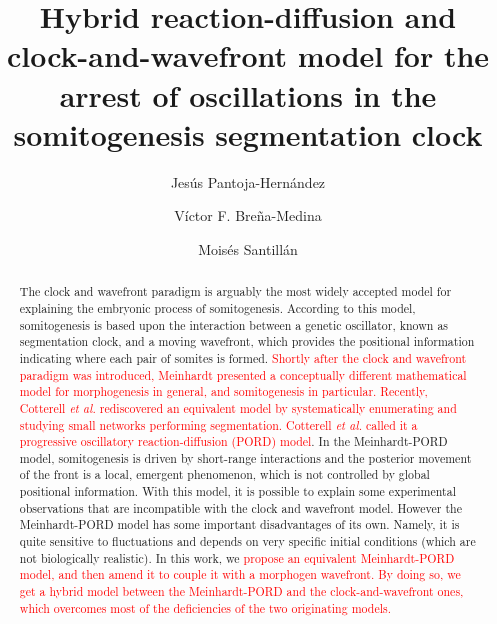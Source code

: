 \documentclass[%
 preprint,
 aip, 
 amsmath,amssymb,
]{revtex4-2}
\begin{document}
\title{Hybrid reaction-diffusion and clock-and-wavefront model for the arrest of oscillations in the somitogenesis segmentation clock}

\author{Jes\'us Pantoja-Hern\'andez}

\author{V\'ictor F. Bre\~na-Medina}

\author{Mois\'es Santill\'an}

\begin{abstract}
The clock and wavefront paradigm is arguably the most widely accepted model for explaining the embryonic process of somitogenesis. According to this model, somitogenesis is based upon the interaction between a genetic oscillator, known as segmentation clock, and a moving wavefront, which provides the positional information indicating where each pair of somites is formed. \textcolor{red}{Shortly after the clock and wavefront paradigm was introduced, Meinhardt presented a conceptually different mathematical model for morphogenesis in general, and somitogenesis in particular. Recently, Cotterell \emph{et al.} rediscovered an equivalent model by systematically enumerating and studying small networks performing segmentation. Cotterell \emph{et al.} called it a progressive oscillatory reaction-diffusion (PORD) model}. In the Meinhardt-PORD model, somitogenesis is driven by short-range interactions and the posterior movement of the front is a local, emergent phenomenon, which is not controlled by global positional information. With this model, it is possible to explain some experimental observations that are incompatible with the clock and wavefront model. However the Meinhardt-PORD model has some important disadvantages of its own. Namely, it is quite sensitive to fluctuations and depends on very specific initial conditions (which are not biologically realistic). In this work, we \textcolor{red}{propose an equivalent Meinhardt-PORD model, and then amend it to couple it with a morphogen wavefront. By doing so, we get a hybrid model between the Meinhardt-PORD and the clock-and-wavefront ones, which overcomes most of the deficiencies of the two originating models.}
\end{abstract}
	
\end{document}
